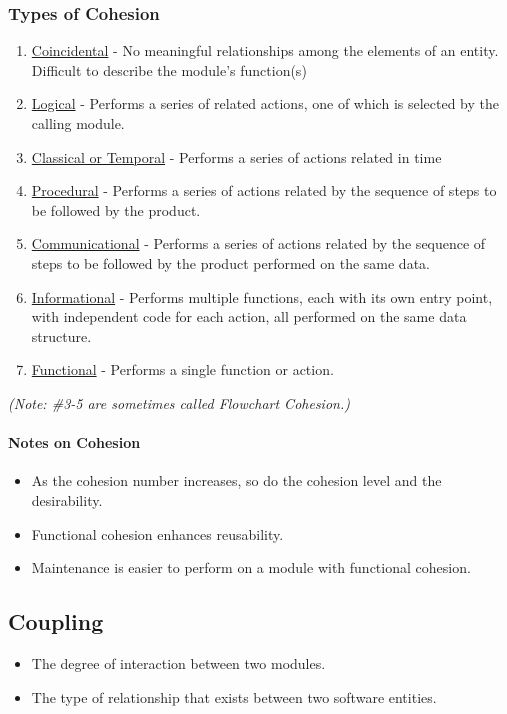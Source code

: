 \documentclass{report}
\begin{document}
				\subsubsection{Types of Cohesion}
					\begin{enumerate}
						\item \underline{Coincidental} - No meaningful relationships among the elements of an entity. Difficult to describe the module's function(s)
						\item \underline{Logical} - Performs a series of related actions, one of which is selected by the calling module.
						\item \underline{Classical or Temporal} - Performs a series of actions related in time
						\item \underline{Procedural} - Performs a series of actions related by the sequence of steps to be followed by the product.
						\item \underline{Communicational} - Performs a series of actions related by the sequence of steps to be followed by the product performed on the same data.
						\item \underline{Informational} - Performs multiple functions, each with its own entry point, with independent code for each action, all performed on the same data structure.
						\item \underline{Functional} - Performs a single function or action.
					\end{enumerate}
					\textit{(Note: \#3-5 are sometimes called Flowchart Cohesion.)}
				\paragraph{Notes on Cohesion}
					\begin{itemize}
						\item As the cohesion number increases, so do the cohesion level and the desirability.
						\item Functional cohesion enhances reusability.
						\item Maintenance is easier to perform on a module with functional cohesion.
					\end{itemize}
			\subsection{Coupling}
				\begin{itemize}
					\item The degree of interaction between two modules.
					\item The type of relationship that exists between two software entities.
				\end{itemize}
\end{document}

